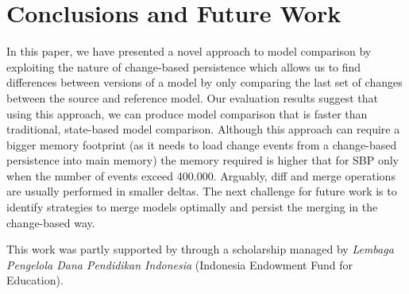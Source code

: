 \documentclass{jot}
\begin{document}
\section{Conclusions and Future Work}
\label{sec:conclusion_and_future_work}
In this paper, we have presented a novel approach to model comparison by exploiting the nature of change-based persistence which allows us to find differences between versions of a model by only comparing the last set of changes between the source and reference model.
Our evaluation results suggest that using this approach, we can produce model comparison that is faster than traditional, state-based model comparison.
Although this approach can require a bigger memory footprint (as it needs to load change events from a change-based persistence into main memory) the memory required is higher that for SBP only when the number of events exceed 400.000.
Arguably, diff and merge operations are usually performed in smaller deltas.
The next challenge for future work is to identify strategies to merge models optimally and persist the merging in the change-based way. 

\backmatter






\begin{acknowledgments}
This work was partly supported by through a scholarship managed by \emph{Lembaga Pengelola Dana Pendidikan Indonesia} (Indonesia Endowment Fund for Education).
\end{acknowledgments}
\end{document}
